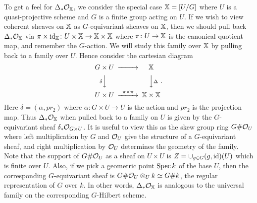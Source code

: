 \documentclass[12pt]{amsart}
\begin{document}
\begin{example}  \label{eg:skyUmodG}
To get a feel for $\Delta_* \mathcal{O}_{\mathbb{X}}$, we consider the special case $\mathbb{X}= [U/G]$ where $U$ is a quasi-projective scheme and $G$ is a finite group acting on $U$. If we wish to view coherent sheaves on $\mathbb{X}$ as $G$-equivariant sheaves on $\mathbb{X}$, then we should pull back $\Delta_* \mathcal{O}_{\mathbb{X}}$ via $\pi \times \operatorname{id}_{\mathbb{X}} \colon U \times \mathbb{X} \to \mathbb{X} \times \mathbb{X}$ where $\pi \colon U \to \mathbb{X}$ is the canonical quotient map, and remember the $G$-action. We will study this family over $\mathbb{X}$ by pulling back to a family over $U$. Hence consider the cartesian diagram
$$\begin{CD}
G \times U @>>> \bX \\
@V{\delta}VV @VV{\Delta}V \\
U \times U @>{\pi \times \pi}>> \bX \times \bX 
\end{CD}.$$
Here $\delta = (\alpha, pr_2)$ where $\alpha \colon G \times U \to U$ is the action and $pr_2$ is the projection map. Thus $\Delta_*\mathcal{O}_{\mathbb{X}}$ when pulled 
back to a family on $U$ is given by the $G$-equivariant sheaf $\delta_* \mathcal{O}_{G \times U}$. It is useful to view this as the skew group ring $G \# \mathcal{O}_U$ where left multiplication by $G$ and $\mathcal{O}_U$ give the structure of a $G$-equivariant sheaf, and right multiplication by $\mathcal{O}_{U}$ determines the geometry of the family.  Note that the support of $G \# \mathcal{O}_U$ as a sheaf on $U \times U$ is $Z = \cup_{g \in G} (g,\operatorname{id})(U)$ which is finite over $U$. Also, if we pick a geometric point $\operatorname{Spec} k$ of the base $U$, then the corresponding $G$-equivariant sheaf is $G \# \mathcal{O}_U \otimes_U k \simeq G \# k$, the regular representation of $G$ over $k$.
In other words, $\Delta_* \mathcal{O}_{\mathbb{X}}$ is analogous to the universal family on the corresponding $G$-Hilbert scheme.
\end{example}
\end{document}
